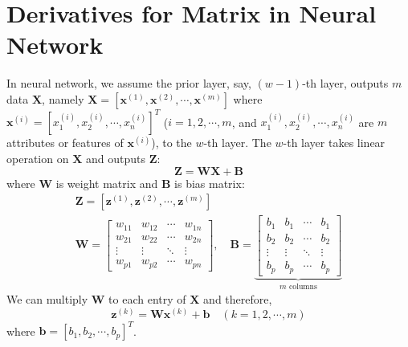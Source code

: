 \documentclass{article}
\begin{document}
\section{Derivatives for Matrix in Neural Network}

In neural network, we assume the prior layer, say, $(w-1)$-th layer, outputs $m$ data $\boldsymbol{X}$, namely $\boldsymbol{X}=[\boldsymbol{x}^{(1)},\boldsymbol{x}^{(2)},\cdots,\boldsymbol{x}^{(m)}]$ where $\boldsymbol{x}^{(i)}=\left[x^{(i)}_1,x^{(i)}_2,\cdots,x^{(i)}_n\right]^T$ ($i=1,2,\cdots,m$, and $x^{(i)}_1,x^{(i)}_2,\cdots,x^{(i)}_n$ are $m$ attributes or features of $\boldsymbol{x}^{(i)}$), to the $w$-th layer. The $w$-th layer takes linear operation on $\boldsymbol{X}$ and outputs $\boldsymbol{Z}$:\begin{equation}
    \boldsymbol{Z}=\boldsymbol{W}\boldsymbol{X}+\boldsymbol{B}
\end{equation}
where $\boldsymbol{W}$ is weight matrix and $\boldsymbol{B}$ is bias matrix:
\begin{subequations}
    \begin{gather}
        \boldsymbol{Z}=\left[
            \boldsymbol{z}^{(1)},\boldsymbol{z}^{(2)},\cdots,\boldsymbol{z}^{(m)}
        \right]\\
        \boldsymbol{W}=\begin{bmatrix}
            w_{11}&w_{12}&\cdots&w_{1n}\\
            w_{21}&w_{22}&\cdots&w_{2n}\\
            \vdots&\vdots&\ddots&\vdots\\
            w_{p1}&w_{p2}&\cdots&w_{pn}
        \end{bmatrix},\quad 
        \boldsymbol{B}=\underbrace{\begin{bmatrix}
            b_{1}&b_{1}&\cdots&b_{1}\\
            b_{2}&b_{2}&\cdots&b_{2}\\
            \vdots&\vdots&\ddots&\vdots\\
            b_{p}&b_{p}&\cdots&b_{p}
        \end{bmatrix}}_{\text{$m$ columns}}
    \end{gather}
\end{subequations}
We can multiply $\boldsymbol{W}$ to each entry of $\boldsymbol{X}$
and therefore,
\begin{equation}
    \boldsymbol{z}^{(k)}=
    \boldsymbol{W}\boldsymbol{x}^{(k)}+\boldsymbol{b}\quad(k=1,2,\cdots,m)
\end{equation}
where $\boldsymbol{b}=[b_1,b_2,\cdots,b_p]^T$.
\end{document}
